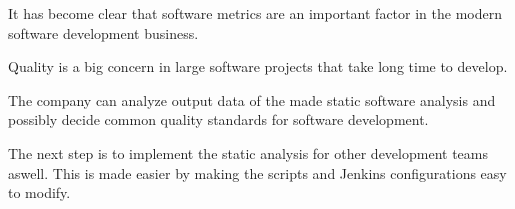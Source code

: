 It has become clear that software metrics are an important factor in the modern software development business.

Quality is a big concern in large software projects that take long time to develop.

The company can analyze output data of the made static software analysis and possibly decide common quality standards for software development.

The next step is to implement the static analysis for other development teams aswell. This is made easier by making the scripts and Jenkins configurations easy to modify.









